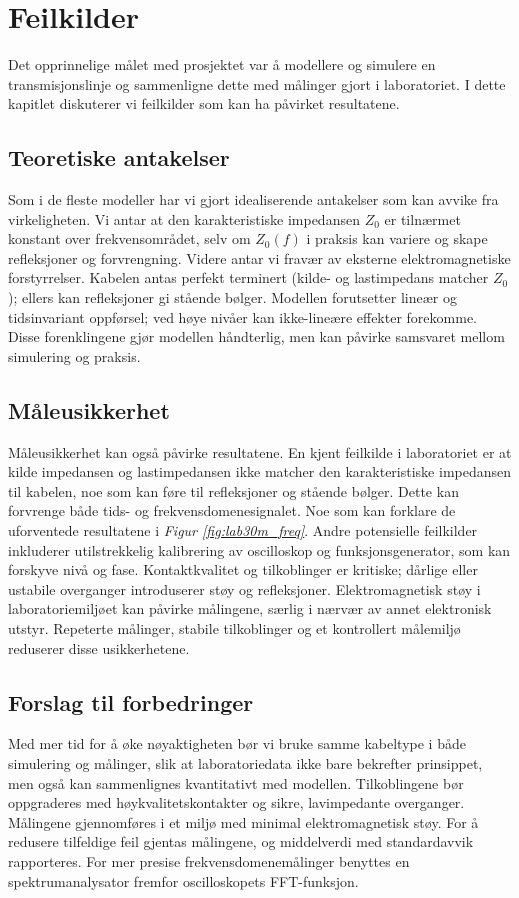 \section{Feilkilder}
Det opprinnelige målet med prosjektet var å modellere og simulere en transmisjonslinje og sammenligne dette med målinger gjort i laboratoriet. I dette kapitlet diskuterer vi feilkilder som kan ha påvirket resultatene.

\subsection{Teoretiske antakelser}
Som i de fleste modeller har vi gjort idealiserende antakelser som kan avvike fra virkeligheten. Vi antar at den karakteristiske impedansen $Z_0$ er tilnærmet konstant over frekvensområdet, selv om $Z_0(f)$ i praksis kan variere og skape refleksjoner og forvrengning. Videre antar vi fravær av eksterne elektromagnetiske forstyrrelser. Kabelen antas perfekt terminert (kilde- og lastimpedans matcher $Z_0$); ellers kan refleksjoner gi stående bølger. Modellen forutsetter lineær og tidsinvariant oppførsel; ved høye nivåer kan ikke-lineære effekter forekomme. Disse forenklingene gjør modellen håndterlig, men kan påvirke samsvaret mellom simulering og praksis.

\subsection{Måleusikkerhet}
Måleusikkerhet kan også påvirke resultatene. En kjent feilkilde i laboratoriet er at kilde impedansen og lastimpedansen ikke matcher den karakteristiske impedansen til kabelen, noe som kan føre til refleksjoner og stående bølger. Dette kan forvrenge både tids- og frekvensdomenesignalet. Noe som kan forklare de uforventede resultatene i \emph{Figur \ref{fig:lab30m_freq}}. Andre potensielle feilkilder inkluderer utilstrekkelig kalibrering av oscilloskop og funksjonsgenerator, som kan forskyve nivå og fase. Kontaktkvalitet og tilkoblinger er kritiske; dårlige eller ustabile overganger introduserer støy og refleksjoner. Elektromagnetisk støy i laboratoriemiljøet kan påvirke målingene, særlig i nærvær av annet elektronisk utstyr. Repeterte målinger, stabile tilkoblinger og et kontrollert målemiljø reduserer disse usikkerhetene.

\subsection{Forslag til forbedringer}
Med mer tid for å øke nøyaktigheten bør vi bruke samme kabeltype i både simulering og målinger, slik at laboratoriedata ikke bare bekrefter prinsippet, men også kan sammenlignes kvantitativt med modellen. Tilkoblingene bør oppgraderes med høykvalitetskontakter og sikre, lavimpedante overganger. Målingene gjennomføres i et miljø med minimal elektromagnetisk støy. For å redusere tilfeldige feil gjentas målingene, og middelverdi med standardavvik rapporteres. For mer presise frekvensdomenemålinger benyttes en spektrumanalysator fremfor oscilloskopets FFT-funksjon.
